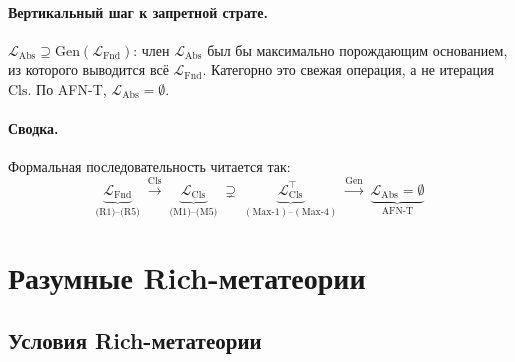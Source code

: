 \documentclass[11pt]{article}
\theoremstyle{plain}
\theoremstyle{definition}
\newcommand{\LFnd}{\mathcal{L}_{\mathrm{Fnd}}}
\newcommand{\LCls}{\mathcal{L}_{\mathrm{Cls}}}
\newcommand{\LClsMax}{\mathcal{L}_{\mathrm{Cls}}^{\top}}
\newcommand{\LAbs}{\mathcal{L}_{\mathrm{Abs}}}
\begin{document}
\paragraph{Вертикальный шаг к запретной страте.} $\LAbs \supseteq \mathrm{Gen}(\LFnd)$: член $\LAbs$ был бы максимально порождающим основанием, из которого выводится всё $\LFnd$. Категорно это свежая операция, а не итерация $\mathrm{Cls}$. По AFN-T, $\LAbs = \emptyset$.

\paragraph{Сводка.} Формальная последовательность читается так:
\[
\underbrace{\LFnd}_{\text{(R1)--(R5)}} \; \xrightarrow{\mathrm{Cls}} \; \underbrace{\LCls}_{\text{(M1)--(M5)}} \; \supsetneq \; \underbrace{\LClsMax}_{(\mathrm{Max}\text{-1})\text{--}(\mathrm{Max}\text{-4})} \; \xrightarrow{\mathrm{Gen}} \; \underbrace{\LAbs = \emptyset}_{\text{AFN-T}}
\]

\section{Разумные Rich-метатеории}\label{sec:rs}

\subsection{Условия Rich-метатеории}
\end{document}
